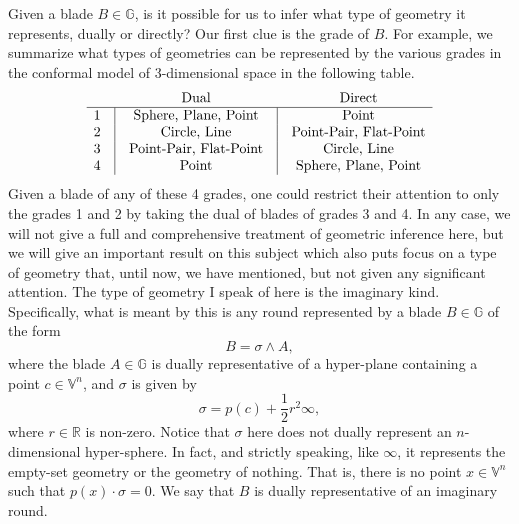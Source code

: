 \documentclass[12pt]{article}
\newcommand{\G}{\mathbb{G}}
\newcommand{\V}{\mathbb{V}}
\newcommand{\R}{\mathbb{R}}
\newcommand{\nvai}{\infty}
\begin{document}
Given a blade $B\in\G$, is it possible for us to infer what type of geometry it
represents, dually or directly?  Our first clue is the grade of $B$.
For example, we summarize what types of geometries can be represented by the various
grades in the conformal model of 3-dimensional space in the following table.
\begin{equation*}
\begin{array}{ccccc}
 &  & \mbox{Dual} & & \mbox{Direct} \\
\hline
1 & \vline & \mbox{Sphere, Plane, Point} & \vline & \mbox{Point} \\
2 & \vline & \mbox{Circle, Line} & \vline & \mbox{Point-Pair, Flat-Point} \\
3 & \vline & \mbox{Point-Pair, Flat-Point} & \vline & \mbox{Circle, Line} \\
4 & \vline & \mbox{Point} & \vline & \mbox{Sphere, Plane, Point}
\end{array}
\end{equation*}
Given a blade of any of these 4 grades, one could restrict their attention to
only the grades 1 and 2 by taking the dual of blades of grades 3 and 4.
In any case, we will not give a full and comprehensive treatment of
geometric inference here, but we will give an important result on this subject
which also puts focus on a type of geometry that, until now, we have
mentioned, but not given any significant attention.  
The type of geometry I speak of here is the imaginary kind.
Specifically, what is meant by this is any round represented by
a blade $B\in\G$ of the form
\begin{equation*}
B = \sigma\wedge A,
\end{equation*}
where the blade $A\in\G$ is dually representative of a hyper-plane containing
a point $c\in\V^n$, and $\sigma$ is given by
\begin{equation*}
\sigma = p(c) + \frac{1}{2}r^2\nvai,
\end{equation*}
where $r\in\R$ is non-zero.  Notice that $\sigma$ here does not dually
represent an $n$-dimensional hyper-sphere.  In fact, and strictly speaking,
like $\nvai$, it represents the empty-set geometry or the geometry of nothing.
That is, there is no point $x\in\V^n$ such that $p(x)\cdot\sigma = 0$.  We say
that $B$ is dually representative of an imaginary round.
\end{document}
